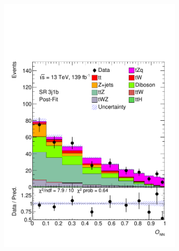 \begin{figure}[!h]
\begin{subfigure}[b]{0.33\linewidth}
    \includegraphics[width=\textwidth]{ubonn-thesis/Chapters/Chapters_07/Figure/Data/SR_3j1b_postFit.pdf} 
  \end{subfigure}%
  \begin{subfigure}[b]{0.33\linewidth}
    \centering

\end{subfigure}
\end{figure}
